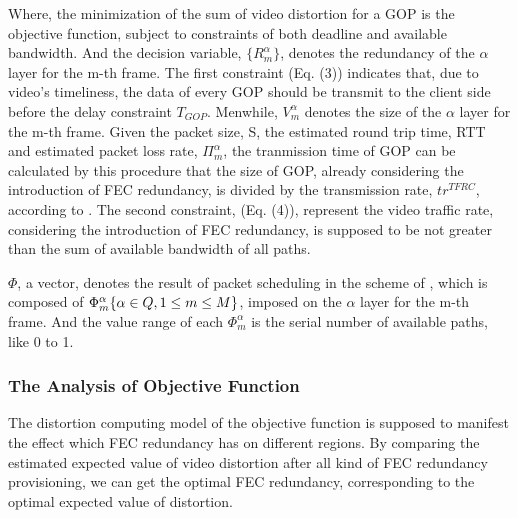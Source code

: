 Where, the minimization of the sum of video distortion for a GOP is the objective function, subject to constraints of both deadline and available bandwidth. And the decision variable, $\{ R_m^\alpha \}$, denotes the redundancy of the $\alpha$ layer for the m-th frame. The first constraint (Eq. (3)) indicates that, due to video's timeliness, the data of every GOP should be transmit to the client side before the delay constraint $T_{GOP}$.
Menwhile, ${V_m^\alpha }$ denotes the size of the $\alpha$ layer for the m-th frame. Given the packet size, S, the estimated round trip time, RTT and estimated packet loss rate, $\Pi_m^\alpha$, the tranmission time of GOP can be calculated by this procedure that the size of GOP, already considering the introduction of FEC redundancy, is divided by the transmission rate, $t{r^{TFRC}}$, according to \cite{TRFC}. 
The second constraint, (Eq. (4)), represent the video traffic rate, considering the introduction of FEC redundancy, is supposed to be not greater than the sum of available bandwidth of all paths.

$\Phi$, a vector, denotes the result of packet scheduling in the scheme of \cite{MPMTP}, which is composed of $\Phi
_m^\alpha {\rm{\{ }}\alpha  \in Q,1 \le m \le M{\rm{\} }}$,  imposed on the $\alpha$ layer for the m-th frame. And the value range of each $\Phi _m^\alpha $ is the serial number of available paths, like 0 to 1.








\subsubsection{The Analysis of Objective Function}

The distortion computing model of the objective function is supposed to manifest the effect which FEC redundancy has on different regions.
By comparing the estimated expected value of video distortion after all kind of FEC redundancy provisioning, we can get the optimal FEC redundancy, corresponding to the optimal expected value of distortion. 

